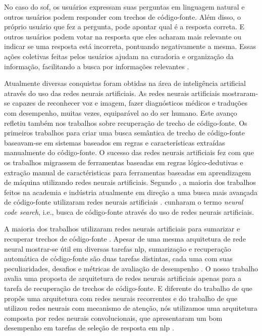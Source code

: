 No caso do \Gls{sof}, os usuários expressam suas perguntas em linguagem natural e outros usuários podem responder com trechos de código-fonte. Além disso, o próprio usuário que fez a pergunta, pode apontar qual é a resposta correta. E outros usuários podem votar na resposta que eles acharam mais relevante ou indicar se uma resposta está incorreta, pontuando negativamente a mesma. Essas ações coletivas feitas pelos usuários ajudam na curadoria e organização da informação, facilitando a busca por informações relevantes \citep{Wang-quora:2013, cambronero-deep-learning-code-search:2019}. 

Atualmente diversas conquistas foram obtidas na área de inteligência artificial através do uso das redes neurais artificiais. As redes neurais artificiais mostraram-se capazes de reconhecer voz e imagem, fazer diagnósticos médicos e traduções com desempenho, muitas vezes, equiparável ao do ser humano. Este avanço refletiu também nos trabalhos sobre recuperação de trecho de código-fonte. Os primeiros trabalhos para criar uma busca semântica de trecho de código-fonte baseavam-se em sistemas baseados em regras e características extraídas manualmente do código-fonte. O sucesso das redes neurais artificiais fez com que os trabalhos migrassem de ferramentas baseadas em regras lógico-dedutivas e extração manual de caractéristicas para ferramentas baseadas em aprendizagem de máquina utilizando redes neurais artificiais. Segundo \cite{cambronero-deep-learning-code-search:2019}, a maioria dos trabalhos feitos na academia e indústria atualmente em direção a uma busca mais avançada de código-fonte utilizaram redes neurais artificiais \citep{Gu-deep-code-search:2018, yao-2018, iyer-etal-2016-summarizing, Allamanis-bimodal-source-code-natural-language:2015, Chen-bi-variational-autoencoder:2018, Sachdev-neural-code-search:2018, cambronero-deep-learning-code-search:2019}. \cite{cambronero-deep-learning-code-search:2019} cunharam o termo \textit{neural code search}, i.e., busca de código-fonte através do uso de redes neurais artificiais.


A maioria dos trabalhos utilizaram redes neurais artificiais para sumarizar e recuperar trechos de código-fonte \citep{iyer-etal-2016-summarizing, Allamanis-bimodal-source-code-natural-language:2015, Chen-bi-variational-autoencoder:2018}. Apesar de uma mesma arquitetura de rede neural mostrar-se 
útil em diversas tarefas \acrshort{nlp}, sumarização e recuperação automática de código-fonte são duas tarefas distintas, cada uma com suas peculiaridades, desafios e métricas de avaliação de desempenho \citep{allahyari-text-summarization-2017}. O nosso trabalho avalia uma proposta de arquitetura de redes neurais artificiais apenas para a tarefa de recuperação de trechos de código-fonte. E diferente do trabalho de \cite{Gu-deep-code-search:2018} que propôs uma arquitetura com redes neurais recorrentes e do trabalho de \cite{cambronero-deep-learning-code-search:2019} que utilizou redes neurais com mecanismo de atenção, nós utilizamos uma arquitetura composta por redes neurais convolucionais, que apresentaram um bom desempenho em tarefas de seleção de resposta em \acrshort{nlp} \citep{feng-2015, tan-lstm-qa, wen-joint-modeling-question-answer-2019}.


